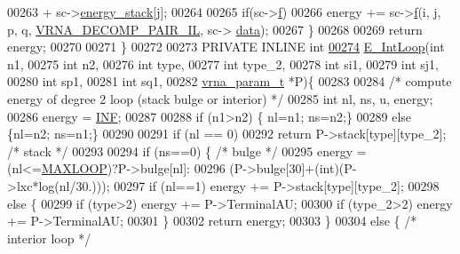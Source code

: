 \begin{DoxyCode}
00263                   + sc->\hyperlink{group__soft__constraints_ac20dded6068e81acd0f1139092f66a22}{energy\_stack}[j];
00264 
00265     \textcolor{keywordflow}{if}(sc->\hyperlink{group__soft__constraints_a32dc86090237888c75491bbd4861a04b}{f})
00266       energy += sc->\hyperlink{group__soft__constraints_a32dc86090237888c75491bbd4861a04b}{f}(i, j, p, q, \hyperlink{group__constraints_gaeab04f34d7730cff2d651d782f95d857}{VRNA\_DECOMP\_PAIR\_IL}, sc->
      \hyperlink{group__soft__constraints_a7574680143df97b9029146c2150bf06d}{data});
00267   \}
00268 
00269   \textcolor{keywordflow}{return} energy;
00270 
00271 \}
00272 
00273 PRIVATE INLINE \textcolor{keywordtype}{int}
\hypertarget{interior__loops_8h_source.tex_l00274}{}\hyperlink{group__loops_gaafbc187b7f78e8e82afb77dd6f3b8fc5}{00274} \hyperlink{group__loops_gaafbc187b7f78e8e82afb77dd6f3b8fc5}{E\_IntLoop}(\textcolor{keywordtype}{int} n1,
00275           \textcolor{keywordtype}{int} n2,
00276           \textcolor{keywordtype}{int} type,
00277           \textcolor{keywordtype}{int} type\_2,
00278           \textcolor{keywordtype}{int} si1,
00279           \textcolor{keywordtype}{int} sj1,
00280           \textcolor{keywordtype}{int} sp1,
00281           \textcolor{keywordtype}{int} sq1,
00282           \hyperlink{group__energy__parameters_structvrna__param__s}{vrna\_param\_t} *P)\{
00283 
00284   \textcolor{comment}{/* compute energy of degree 2 loop (stack bulge or interior) */}
00285   \textcolor{keywordtype}{int} nl, ns, u, energy;
00286   energy = \hyperlink{energy__const_8h_a12c2040f25d8e3a7b9e1c2024c618cb6}{INF};
00287 
00288   \textcolor{keywordflow}{if} (n1>n2) \{ nl=n1; ns=n2;\}
00289   \textcolor{keywordflow}{else} \{nl=n2; ns=n1;\}
00290 
00291   \textcolor{keywordflow}{if} (nl == 0)
00292     \textcolor{keywordflow}{return} P->stack[type][type\_2];  \textcolor{comment}{/* stack */}
00293 
00294   \textcolor{keywordflow}{if} (ns==0) \{                      \textcolor{comment}{/* bulge */}
00295     energy = (nl<=\hyperlink{energy__const_8h_ad1bd6eabac419670ddd3c9ed82145988}{MAXLOOP})?P->bulge[nl]:
00296       (P->bulge[30]+(\textcolor{keywordtype}{int})(P->lxc*log(nl/30.)));
00297     \textcolor{keywordflow}{if} (nl==1) energy += P->stack[type][type\_2];
00298     \textcolor{keywordflow}{else} \{
00299       \textcolor{keywordflow}{if} (type>2) energy += P->TerminalAU;
00300       \textcolor{keywordflow}{if} (type\_2>2) energy += P->TerminalAU;
00301     \}
00302     \textcolor{keywordflow}{return} energy;
00303   \}
00304   \textcolor{keywordflow}{else} \{                            \textcolor{comment}{/* interior loop */}

\end{DoxyCode}
